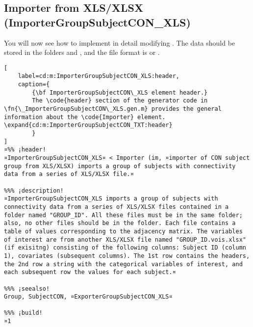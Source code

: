 \documentclass{tufte-handout}
\begin{document}
\clearpage

\subsection{Importer from XLS/XLSX (ImporterGroupSubjectCON\_XLS)}

You will now see how to implement in detail  modifying . The data should be stored in the folders  and , and the file format is  or .

\begin{lstlisting}[
	label=cd:m:ImporterGroupSubjectCON_XLS:header,
	caption={
		{\bf ImporterGroupSubjectCON\_XLS element header.}
		The \code{header} section of the generator code in \fn{\_ImporterGroupSubjectCON\_XLS.gen.m} provides the general information about the \code{Importer} element. \expand{cd:m:ImporterGroupSubjectCON_TXT:header}
		}
]
¤%% ¡header!
¤ImporterGroupSubjectCON_XLS¤ < Importer (im, ¤importer of CON subject group from XLS/XLSX) imports a group of subjects with connectivity data from a series of XLS/XLSX file.¤

%%% ¡description!
¤ImporterGroupSubjectCON_XLS imports a group of subjects with connectivity data from a series of XLS/XLSX files contained in a folder named "GROUP_ID". All these files must be in the same folder; also, no other files should be in the folder. Each file contains a table of values corresponding to the adjacency matrix. The variables of interest are from another XLS/XLSX file named "GROUP_ID.vois.xlsx" (if exisitng) consisting of the following columns: Subject ID (column 1), covariates (subsequent columns). The 1st row contains the headers, the 2nd row a string with the categorical variables of interest, and each subsequent row the values for each subject.¤

%%% ¡seealso!
Group, SubjectCON, ¤ExporterGroupSubjectCON_XLS¤

%%% ¡build!
¤1
\end{lstlisting}
\end{document}

